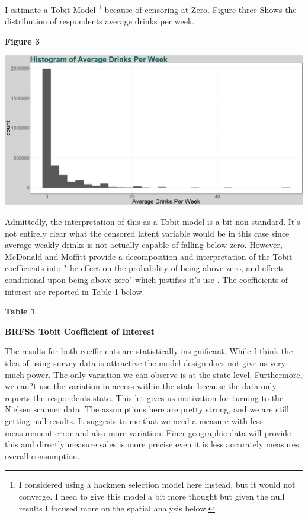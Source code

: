 \documentclass[11pt]{article}
\begin{document}
I estimate a Tobit Model  \footnote{I considered using a hackmen selection model here instead, but it would not converge. I need to give this model a bit more thought but given the null results I focused more on the spatial analysis below.} because of censoring at Zero. Figure three Shows the distribution of respondents average drinks per week. 

\begin{center}
	
	\centering
	\textbf{Figure 3}\par\medskip
	\includegraphics[width=1\linewidth]{Hist_nm_aved_week.png}
\end{center}

Admittedly, the interpretation of this as a Tobit model is a bit non standard. It's not entirely clear what the censored latent variable would be in this case since average weakly drinks is not actually capable of falling below zero. However, McDonald and Moffitt provide a decomposition and interpretation of the Tobit coefficients into "the effect on the probability of being above zero, and effects conditional upon being above zero" which justifies it's use \cite{Mcdon_moffit}. The coefficients of interest are reported in Table 1 below. 


\begin{center}
	
	\centering
		\LARGE{\textbf{Table 1}}\par\medskip
		
	\normalsize{\textbf{BRFSS Tobit Coefficient of Interest}}\par\medskip
	\scalebox{1}{
		
	}
\end{center}

The results for both coefficients are statistically insignificant. While I think the idea of using survey data is attractive the model design does not give us very much power. The only variation we can observe is at the state level. Furthermore, we can?t use the variation in access within the state because the data only reports the respondents state. This let gives us motivation for turning to the Nielsen scanner data.  The assumptions here are pretty strong, and we are still getting null results. It suggests to me that we need a measure with less measurement error and also more variation. Finer geographic data will provide this and directly measure sales is more precise even it is less accurately measures overall consumption. 
\end{document}
